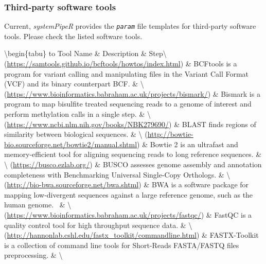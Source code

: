 \documentclass[14pt,]{article}
\begin{document}
\hypertarget{tools}{%
\subsubsection{Third-party software tools}\label{tools}}

Current, \emph{systemPipeR} provides the \emph{\texttt{param}} file templates for third-party software tools. Please check the listed software tools.

\textbackslash{}begin\{tabu\} to 
\hline
Tool Name \& Description \& Step\textbackslash{}
\hline
[BCFtools](\url{https://samtools.github.io/bcftools/howtos/index.html}) \& BCFtools is a program for variant calling and manipulating files in the Variant Call Format (VCF) and its binary counterpart BCF. \& \textbackslash{}
\hline
[Bismark](\url{https://www.bioinformatics.babraham.ac.uk/projects/bismark/}) \& Bismark is a program to map bisulfite treated sequencing reads to a genome of interest and perform methylation calls in a single step. \& \textbackslash{}
\hline
[Blast](\url{https://www.ncbi.nlm.nih.gov/books/NBK279690/}) \& BLAST finds regions of similarity between biological sequences. \& \textbackslash{}
\hline
[Bowtie2](\url{http://bowtie-bio.sourceforge.net/bowtie2/manual.shtml}) \& Bowtie 2 is an ultrafast and memory-efficient tool for aligning sequencing reads to long reference sequences. \& \textbackslash{}
\hline
[Busco](\url{https://busco.ezlab.org/}) \& BUSCO assesses genome assembly and annotation completeness with Benchmarking Universal Single-Copy Orthologs. \& \textbackslash{}
\hline
[bwa](\url{http://bio-bwa.sourceforge.net/bwa.shtml}) \& BWA is a software package for mapping low-divergent sequences against a large reference genome, such as the human genome.~ \& \textbackslash{}
\hline
[Fastqc](\url{https://www.bioinformatics.babraham.ac.uk/projects/fastqc/}) \& FastQC is a quality control tool for high throughput sequence data. \& \textbackslash{}
(\url{http://hannonlab.cshl.edu/fastx_toolkit/commandline.html}) \& FASTX-Toolkit is a collection of command line tools for Short-Reads FASTA/FASTQ files preprocessing. \& \textbackslash{}
\end{document}
